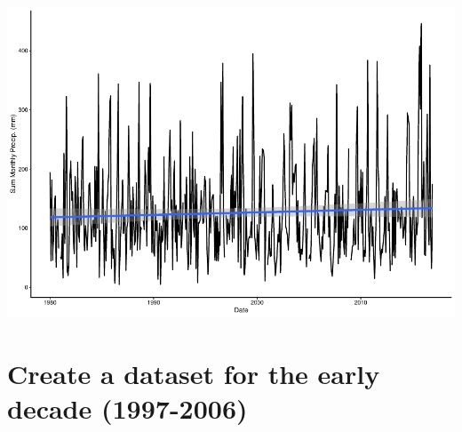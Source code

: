 \documentclass[
  12pt,
]{article}
\begin{document}
\includegraphics{Project_Template_TLK_files/figure-latex/clean-2.pdf}

\hypertarget{create-a-dataset-for-the-early-decade-1997-2006}{%
\section{Create a dataset for the early decade
(1997-2006)}\label{create-a-dataset-for-the-early-decade-1997-2006}}
\end{document}
